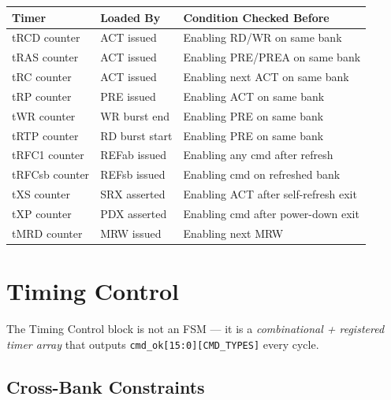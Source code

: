 \documentclass[11pt,a4paper]{article}
\begin{document}
\begin{center}
\begin{tabular}{L{3.5cm} L{5cm} L{5.5cm}}
\toprule
\textbf{Timer} & \textbf{Loaded By} & \textbf{Condition Checked Before} \\
\midrule
{}
tRCD counter    & ACT issued          & Enabling RD/WR on same bank \\
tRAS counter    & ACT issued          & Enabling PRE/PREA on same bank \\
tRC counter     & ACT issued          & Enabling next ACT on same bank \\
tRP counter     & PRE issued          & Enabling ACT on same bank \\
tWR counter     & WR burst end        & Enabling PRE on same bank \\
tRTP counter    & RD burst start      & Enabling PRE on same bank \\
tRFC1 counter   & REFab issued        & Enabling any cmd after refresh \\
tRFCsb counter  & REFsb issued        & Enabling cmd on refreshed bank \\
tXS counter     & SRX asserted        & Enabling ACT after self-refresh exit \\
tXP counter     & PDX asserted        & Enabling cmd after power-down exit \\
tMRD counter    & MRW issued          & Enabling next MRW \\
\bottomrule
\end{tabular}
\end{center}

\section{Timing Control}

The Timing Control block is not an FSM — it is a \textit{combinational + registered
timer array} that outputs \texttt{cmd\_ok[15:0][CMD\_TYPES]} every cycle.

\subsection{Cross-Bank Constraints}
\end{document}
